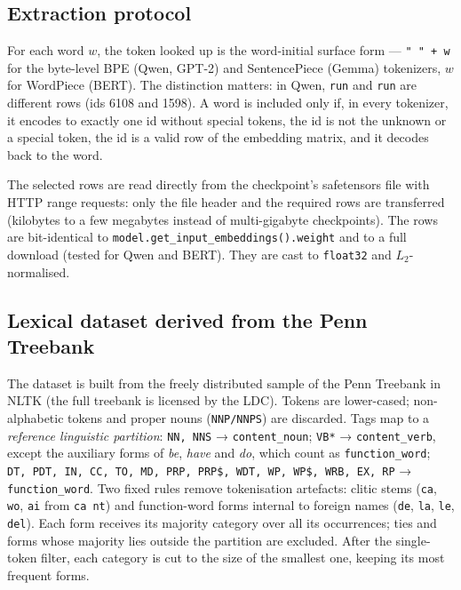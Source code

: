 \documentclass[conference,a4paper]{IEEEtran}
\begin{document}
\subsection{Extraction protocol}\label{sec:extraction-protocol}

For each word \(w\), the token looked up is the word-initial surface
form --- \texttt{"\ "\ +\ w} for the byte-level BPE (Qwen, GPT-2) and
SentencePiece (Gemma) tokenizers, \(w\) for WordPiece (BERT). The
distinction matters: in Qwen, \texttt{run} and \texttt{run} are
different rows (ids 6108 and 1598). A word is included only if, in every
tokenizer, it encodes to exactly one id without special tokens, the id
is not the unknown or a special token, the id is a valid row of the
embedding matrix, and it decodes back to the word.

The selected rows are read directly from the checkpoint's safetensors
file with HTTP range requests: only the file header and the required
rows are transferred (kilobytes to a few megabytes instead of
multi-gigabyte checkpoints). The rows are bit-identical to
\texttt{model.get\_input\_embeddings().weight} and to a full download
(tested for Qwen and BERT). They are cast to \texttt{float32} and
\(L_2\)-normalised.

\subsection{Lexical dataset derived from the Penn
Treebank}\label{sec:lexical-dataset-derived}

The dataset is built from the freely distributed sample of the Penn
Treebank \cite{r20} in NLTK \cite{r21} (the full treebank is licensed by
the LDC). Tokens are lower-cased; non-alphabetic tokens and proper nouns
(\texttt{NNP/NNPS}) are discarded. Tags map to a \emph{reference
linguistic partition}: \texttt{NN,\ NNS} → \texttt{content\_noun};
\texttt{VB*} → \texttt{content\_verb}, except the auxiliary forms of
\emph{be}, \emph{have} and \emph{do}, which count as
\texttt{function\_word};
\texttt{DT,\ PDT,\ IN,\ CC,\ TO,\ MD,\ PRP,\ PRP\$,\ WDT,\ WP,\ WP\$,\ WRB,\ EX,\ RP}
→ \texttt{function\_word}. Two fixed rules remove tokenisation
artefacts: clitic stems (\texttt{ca}, \texttt{wo}, \texttt{ai} from
\texttt{ca\ n\textquotesingle{}t}) and function-word forms internal to
foreign names (\texttt{de}, \texttt{la}, \texttt{le}, \texttt{del}).
Each form receives its majority category over all its occurrences; ties
and forms whose majority lies outside the partition are excluded. After
the single-token filter, each category is cut to the size of the
smallest one, keeping its most frequent forms.
\end{document}
